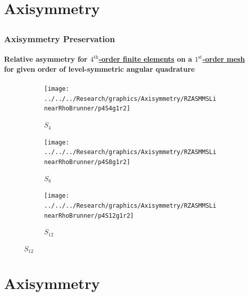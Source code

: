 \documentclass[compress,t]{beamer}
\begin{document}
\section{Axisymmetry}
\subsection{}

\begin{frame}
\frametitle{Axisymmetry Preservation}
\framesubtitle{Relative asymmetry for \underline{$4^\text{th}$-order finite elements} on a \underline{$1^\text{st}$-order mesh} for given order of level-symmetric angular quadrature}

\begin{figure}
\centering
\begin{subfigure}{0.33\textwidth}
\centering
\texttt{[image: ../../../Research/graphics/Axisymmetry/RZASMMSLinearRhoBrunner/p4S4g1r2]}
\caption{$S_4$}
\end{subfigure}%
\begin{subfigure}{0.33\textwidth}
\centering
\texttt{[image: ../../../Research/graphics/Axisymmetry/RZASMMSLinearRhoBrunner/p4S8g1r2]}
\caption{$S_8$}
\end{subfigure}%
\begin{subfigure}{0.33\textwidth}
\centering
\texttt{[image: ../../../Research/graphics/Axisymmetry/RZASMMSLinearRhoBrunner/p4S12g1r2]}
\caption{$S_{12}$}
\end{subfigure}
\end{figure}

\end{frame}

\section{Axisymmetry}
\subsection{}
\end{document}
